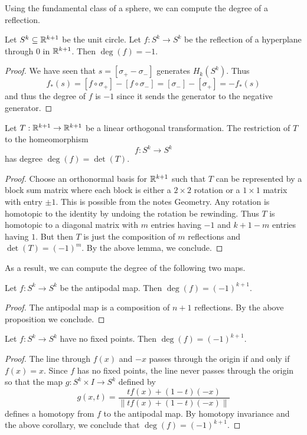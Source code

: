 \documentclass[a4paper]{article}
\begin{document}
Using the fundamental class of a sphere, we can compute the degree of a reflection. 

\begin{lmm}{}{} Let $S^k\subseteq\mathbb{R}^{k+1}$ be the unit circle. Let $f:S^k\to S^k$ be the reflection of a hyperplane through $0$ in $\mathbb{R}^{k+1}$. Then $\deg(f)=-1$. \tcbline
\begin{proof}
We have seen that $s=[\sigma_+-\sigma_-]$ generates $H_k(S^k)$. Thus $$f_\ast(s)=[f\circ\sigma_+]-[f\circ\sigma_-]=[\sigma_-]-[\sigma_+]=-f_\ast(s)$$ and thus the degree of $f$ is $-1$ since it sends the generator to the negative generator. 
\end{proof}
\end{lmm}

\begin{prp}{}{} Let $T:\mathbb{R}^{k+1}\to\mathbb{R}^{k+1}$ be a linear orthogonal transformation. The restriction of $T$ to the homeomorphism $$f:S^k\to S^k$$ has degree $\deg(f)=\det(T)$. \tcbline
\begin{proof}
Choose an orthonormal basis for $\mathbb{R}^{k+1}$ such that $T$ can be represented by a block sum matrix where each block is either a $2\times 2$ rotation or a $1\times 1$ matrix with entry $\pm 1$. This is possible from the notes Geometry. Any rotation is homotopic to the identity by undoing the rotation be rewinding. Thus $T$ is homotopic to a diagonal matrix with $m$ entries having $-1$ and $k+1-m$ entries having $1$. But then $T$ is just the composition of $m$ reflections and $\det(T)=(-1)^m$. By the above lemma, we conclude. 
\end{proof}
\end{prp}

As a result, we can compute the degree of the following two maps. 

\begin{crl}{}{} Let $f:S^k\to S^k$ be the antipodal map. Then $\deg(f)=(-1)^{k+1}$. \tcbline
\begin{proof}
The antipodal map is a composition of $n+1$ reflections. By the above proposition we conclude. 
\end{proof}
\end{crl}

\begin{crl}{}{} Let $f:S^k\to S^k$ have no fixed points. Then $\deg(f)=(-1)^{k+1}$. \tcbline
\begin{proof}
The line through $f(x)$ and $-x$ passes through the origin if and only if $f(x)=x$. Since $f$ has no fixed points, the line never passes through the origin so that the map $g:S^k\times I\to S^k$ defined by $$g(x,t)=\frac{tf(x)+(1-t)(-x)}{\|tf(x)+(1-t)(-x)\|}$$ defines a homotopy from $f$ to the antipodal map. By homotopy invariance and the above corollary, we conclude that $\deg(f)=(-1)^{k+1}$. 
\end{proof}
\end{crl}
\end{document}
